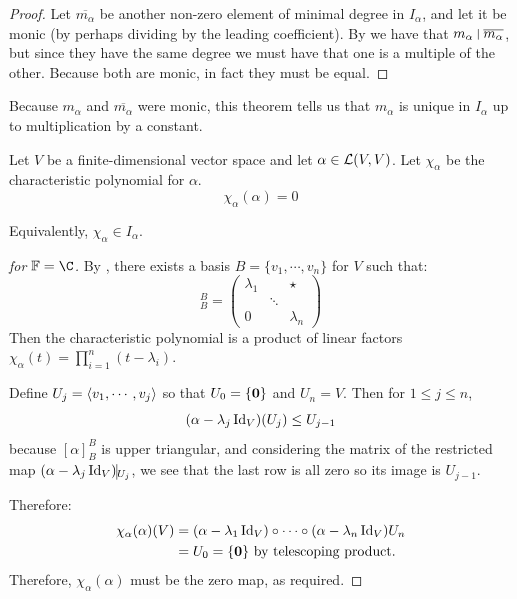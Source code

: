 \documentclass[../Main.tex]{subfiles}
\begin{document}
\begin{proof}
    Let $\overline{m_\alpha}$ be another non-zero element of minimal degree in $I_\alpha$, and let it be monic (by perhaps dividing by the leading coefficient). By  we have that $m_\alpha~\vline~\overline{m_\alpha}$, but since they have the same degree we must have that one is a multiple of the other. Because both are monic, in fact they must be equal.
\end{proof}
\begin{remark}
    Because $m_\alpha$ and $\overline{m_\alpha}$ were monic, this theorem tells us that $m_\alpha$ is unique in $I_\alpha$ up to multiplication by a constant.
\end{remark}
\begin{theorem}
    Let $V$ be a finite-dimensional vector space and let $\alpha \in \mathcal{L}(V, V)$. Let $\chi_\alpha$ be the characteristic polynomial for $\alpha$.
    \begin{equation*}
        \chi_\alpha(\alpha) = 0
    \end{equation*}
    \label{thmCayleyHamilton}
\end{theorem}
\begin{remark}
    Equivalently, $\chi_\alpha \in I_\alpha$.
\end{remark}
\begin{proof}[for $\F = \C$]
    By , there exists a basis $B = \{v_1, \cdots, v_n\}$ for $V$ such that:
    \begin{equation*}
        [\alpha]_B^B =
        \begin{pmatrix}
            \lambda_1 &  & \star \\
             & \ddots &  \\
            0 &  & \lambda_n
        \end{pmatrix}
    \end{equation*}
    Then the characteristic polynomial is a product of linear factors $\chi_\alpha(t) = \prod_{i=1}^{n} (t - \lambda_i)$.

    Define $U_j = \left\langle v_1, \cdots, v_j \right\rangle$ so that $U_0 = \{\boldsymbol{0}\}$ and $U_n = V$. Then for $1 \leq j \leq n$,
    \begin{equation*}
        (\alpha - \lambda_j \operatorname{Id}_V)(U_j) \leq U_{j-1}
    \end{equation*}
    because $[\alpha]_B^B$ is upper triangular, and considering the matrix of the restricted map $(\alpha - \lambda_j \Id_V)\vline_{U_j}$, we see that the last row is all zero so its image is $U_{j-1}$.

    Therefore:
    \begin{align*}
        \chi_\alpha(\alpha) (V)&= (\alpha - \lambda_1 \operatorname{Id}_V) \circ \cdots \circ (\alpha - \lambda_n \operatorname{Id}_V)U_n \\
        &= U_0 = \{\boldsymbol{0}\} \text{ by telescoping product.}
    \end{align*}
    Therefore, $\chi_\alpha(\alpha)$ must be the zero map, as required.
\end{proof}
\end{document}
